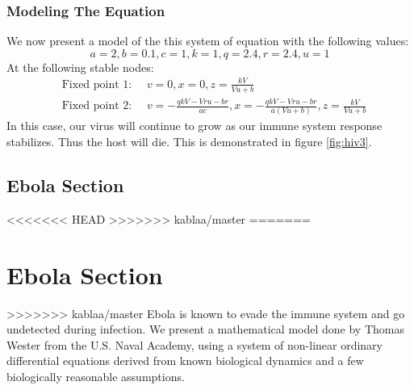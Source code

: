 \documentclass{article}
\begin{document}
\subsubsection{Modeling The Equation}
We now present a model of the this system of equation with the following values:
\begin{equation}
a=2,b= 0.1,c=1,k=1,q= 2.4,r= 2.4,u=1
\end{equation}
At the following stable nodes:
\begin{equation}
\begin{split}
&\text{Fixed point 1: } \quad v=0,x=0,z={\frac {kV}{Vu+b}}   \\
&\text{Fixed point 2: } \quad  v=-{\frac {qkV-Vru-br}{ac}},x=-{\frac {qkV-Vru-br}{a \left( Vu+b \right) }},z={\frac {kV}{Vu+b}}
\end{split}
\label{eq:fixed}
\end{equation}
In this case, our virus will continue to grow as our immune system response stabilizes. Thus the host will die. 
This is demonstrated in figure \ref{fig:hiv3}.

\subsection{Ebola Section}
<<<<<<< HEAD
>>>>>>> kablaa/master
=======


\section{Ebola Section}
>>>>>>> kablaa/master
Ebola is known to evade the immune system and go undetected during infection. We present a mathematical model done by Thomas Wester from the U.S. Naval Academy, using a system of non-linear ordinary differential equations derived from known biological dynamics and a few biologically reasonable assumptions.
\end{document}
